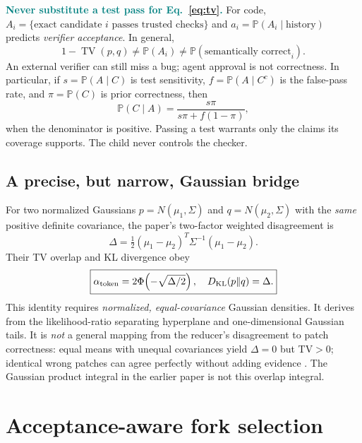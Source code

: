 \documentclass[10pt,twocolumn]{article}
\newcommand{\Claim}[1]{\noindent\textcolor{teal}{\textbf{#1}}\;}
\newcommand{\1}{\mathbf{1}}
\newcommand{\TV}{\operatorname{TV}}
\newcommand{\Prb}{\mathbb{P}}
\begin{document}
\Claim{Never substitute a test pass for Eq.~\eqref{eq:tv}.} For code, $A_i=\{\text{exact candidate }i\text{ passes trusted checks}\}$ and $a_i=\Prb(A_i\mid\text{history})$ predicts \emph{verifier acceptance}. In general,
\begin{equation}
 1-\TV(p,q)\ne \Prb(A_i)\ne\Prb(\text{semantically correct}_i).
\end{equation}
An external verifier can still miss a bug; agent approval is not correctness. In particular, if $s=\Prb(A\mid C)$ is test sensitivity, $f=\Prb(A\mid C^c)$ is the false-pass rate, and $\pi=\Prb(C)$ is prior correctness, then
\begin{equation}
\Prb(C\mid A)=\frac{s\pi}{s\pi+f(1-\pi)},
\end{equation}
when the denominator is positive. Passing a test warrants only the claims its coverage supports. The child never controls the checker.

\subsection{A precise, but narrow, Gaussian bridge}
For two normalized Gaussians $p=N(\mu_1,\Sigma)$ and $q=N(\mu_2,\Sigma)$ with the \emph{same} positive definite covariance, the paper's two-factor weighted disagreement is
\begin{equation}
\label{eq:delta}
\Delta=\tfrac12(\mu_1-\mu_2)^T\Sigma^{-1}(\mu_1-\mu_2).
\end{equation}
Their TV overlap and KL divergence obey
\begin{equation}
\label{eq:gauss}
\boxed{\alpha_{\rm token}=2\Phi\!\left(-\sqrt{\Delta/2}\right),\quad
 D_{\rm KL}(p\|q)=\Delta.}
\end{equation}
This identity requires \emph{normalized, equal-covariance} Gaussian densities. It derives from the likelihood-ratio separating hyperplane and one-dimensional Gaussian tails. It is \emph{not} a general mapping from the reducer's disagreement to patch correctness: equal means with unequal covariances yield $\Delta=0$ but TV$>0$; identical wrong patches can agree perfectly without adding evidence \cite{eliazbmr}. The Gaussian product integral in the earlier paper is not this overlap integral.

\section{Acceptance-aware fork selection}
\end{document}
